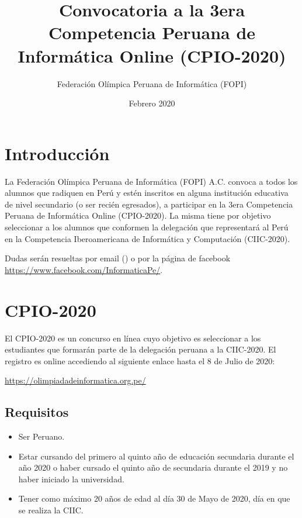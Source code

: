 \documentclass{article}
\title{Convocatoria a la 3era Competencia Peruana de Informática Online (CPIO-2020)
}
\author{Federación Olímpica Peruana de Informática (FOPI)}
\date{Febrero 2020}
\begin{document}
\maketitle

\section{Introducción}

La Federación Olímpica Peruana de Informática (FOPI) A.C. convoca a todos los alumnos que radiquen en Perú y estén inscritos en alguna institución educativa de nivel secundario (o ser recién egresados), a participar en la 3era Competencia Peruana de Informática Online (CPIO-2020). La misma tiene por objetivo seleccionar a los alumnos que conformen la delegación que representará al Perú en la Competencia Iberoamericana de Informática y Computación (CIIC-2020).

Dudas serán resueltas por email 
({\color{blue}{olimpiadaperuanainformatica@gmail.com})}
o por la página de facebook \url{https://www.facebook.com/InformaticaPe/}.



\section{CPIO-2020}

El CPIO-2020 es un concurso en línea cuyo objetivo
es seleccionar a los estudiantes que formarán parte de la delegación peruana a la CIIC-2020.
El registro es online accediendo al siguiente enlace
{\color{red} hasta el 8 de Julio de 2020}:

\begin{center}
\url{https://olimpiadadeinformatica.org.pe/}
\end{center}

\subsection{Requisitos}

\begin{itemize}
    \item Ser Peruano.
    \item Estar cursando del primero al quinto año de educación secundaria durante el año 2020 o haber cursado el quinto año de secundaria durante el 2019  y no haber iniciado la universidad.
    \item Tener como máximo 20 años de edad al día 30 de Mayo de 2020, día en que se realiza la CIIC.
\end{itemize}
\end{document}
